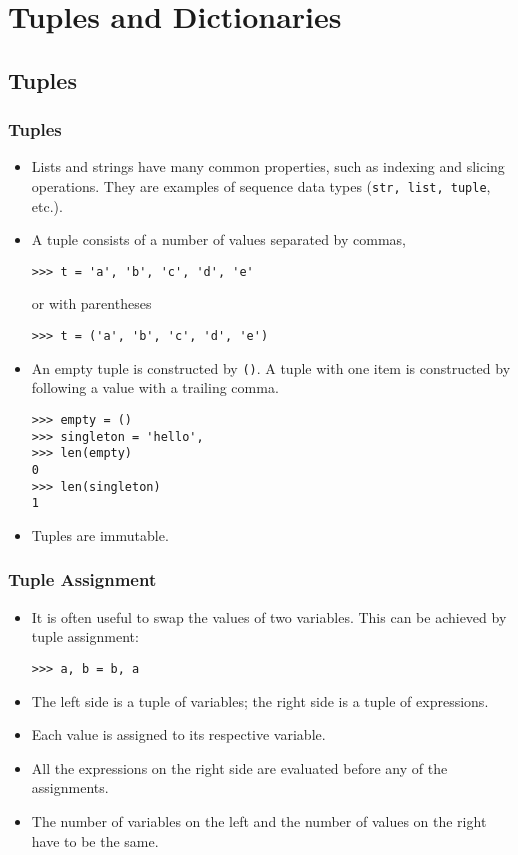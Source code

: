 \documentclass{beamer}
\newcommand{\beforeverb}{\footnotesize}
\newcommand{\afterverb}{\normalsize}
\begin{document}
\section[Tuples and Dictionaries]{Tuples and Dictionaries}
\subsection[Tuples]{Tuples}
\begin{frame}[fragile]
\frametitle{Tuples}
\begin{itemize}
\item Lists and strings have many common properties, such as 
\alert{ indexing} and \alert{slicing} operations. They are examples of \alert{sequence data types} ({\tt str,  list, tuple}, etc.). 
\item  A tuple consists of a number of values separated by commas,
\beforeverb
\begin{verbatim}
>>> t = 'a', 'b', 'c', 'd', 'e'
\end{verbatim}
\afterverb
or with parentheses
\beforeverb
\begin{verbatim}
>>> t = ('a', 'b', 'c', 'd', 'e')
\end{verbatim}
\afterverb
\item An empty tuple is constructed by {\tt ()}. A tuple with one item is constructed by following a value with a trailing \alert{comma}.
\beforeverb
\begin{verbatim}
>>> empty = ()
>>> singleton = 'hello', 
>>> len(empty) 
0 
>>> len(singleton) 
1 
\end{verbatim}
\afterverb
%
\item Tuples are \alert{immutable}. 
\end{itemize}

\end{frame}
\begin{frame}[fragile]
 \frametitle{Tuple Assignment} 
 
\begin{itemize}
\item It is often useful to swap the values of two variables. This can be achieved by \alert{tuple assignment}:
\beforeverb
\begin{verbatim}
>>> a, b = b, a
\end{verbatim}
\afterverb
%
\item The left side is a tuple of variables; the right side is a tuple of
expressions. 
\item  Each value is assigned to its respective variable.  
\item All the expressions on the right side are evaluated \alert{before} any
of the assignments.
\item The number of variables on the left and the number of
values on the right have to be the \alert{same}.
\end{itemize}
\end{frame}
\end{document}
